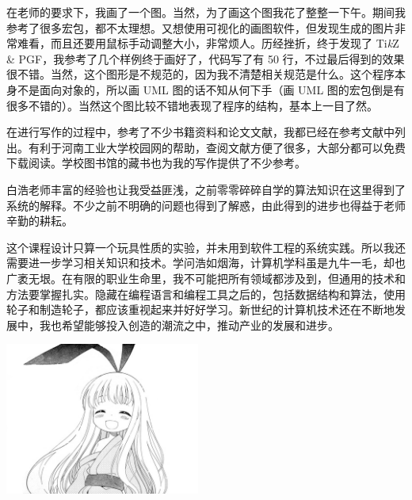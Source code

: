 在老师的要求下，我画了一个图。当然，为了画这个图我花了整整一下午。期间我参考了很多宏包，都不太理想。又想使用可视化的画图软件，但发现生成的图片非常难看，而且还要用鼠标手动调整大小，非常烦人。历经挫折，终于发现了 Ti{\it k}Z \& PGF，我参考了几个样例终于画好了，代码写了有 50 行，不过最后得到的效果很不错。当然，这个图形是不规范的，因为我不清楚相关规范是什么。这个程序本身不是面向对象的，所以画 UML 图的话不知从何下手（画 UML 图的宏包倒是有很多不错的）。当然这个图比较不错地表现了程序的结构，基本上一目了然。

在进行写作的过程中，参考了不少书籍资料和论文文献，我都已经在参考文献中列出。有利于河南工业大学校园网的帮助，查阅文献方便了很多，大部分都可以免费下载阅读。学校图书馆的藏书也为我的写作提供了不少参考。

白浩老师丰富的经验也让我受益匪浅，之前零零碎碎自学的算法知识在这里得到了系统的解释。不少之前不明确的问题也得到了解惑，由此得到的进步也得益于老师辛勤的耕耘。

这个课程设计只算一个玩具性质的实验，并未用到软件工程的系统实践。所以我还需要进一步学习相关知识和技术。学问浩如烟海，计算机学科虽是九牛一毛，却也广袤无垠。在有限的职业生命里，我不可能把所有领域都涉及到，但通用的技术和方法要掌握扎实。隐藏在编程语言和编程工具之后的，包括数据结构和算法，使用轮子和制造轮子，都应该重视起来并好好学习。新世纪的计算机技术还在不断地发展中，我也希望能够投入创造的潮流之中，推动产业的发展和进步。

{
\vfill
\centering
\includegraphics[height=5cm]{image/166.png}
\vfill
}
